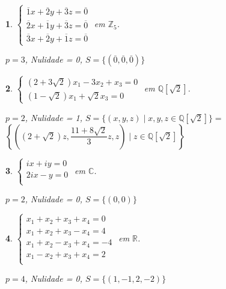 \documentclass[12pt]{exam}
\newtheorem{exercicio}{}
\newcommand{\integer}{\mathbb{Z}}
\newcommand{\rac}{\mathbb{Q}}
\newcommand{\real}{\mathbb{R}}
\newcommand{\complex}{\mathbb{C}}
\begin{document}
\begin{exercicio}
$\begin{cases}
  \overline{1}x + \overline{2}y + \overline{3}z = \overline{0}\\
  \overline{2}x + \overline{1}y + \overline{3}z = \overline{0}\\
  \overline{3}x + \overline{2}y + \overline{1}z = \overline{0}
\end{cases}$ em $\integer_5$.
\begin{solucao}
  $p = 3$, Nulidade = 0, $S = \{(\overline{0},\overline{0},\overline{0})\}$
\end{solucao}
\end{exercicio}

\begin{exercicio}
$\begin{cases}
  (2 + 3\sqrt{2})x_1 - 3x_2 + x_3 = 0\\
  (1 - \sqrt{2})x_1 + \sqrt{2}x_3 = 0
\end{cases}$ em $\rac[\sqrt{2}]$.
\begin{solucao}
  $p = 2$, Nulidade = 1, $S = \{(x, y, z) \mid x, y, z \in \rac[\sqrt{2}]\} = $ \\ $\left\{\left((2 + \sqrt{2})z, \dfrac{11 + 8\sqrt{2}}{3}z, z\right) \mid z \in \rac[\sqrt{2}]\right\}$
\end{solucao}
\end{exercicio}

\begin{exercicio}
$\begin{cases}
  ix + iy = 0\\
  2ix - y = 0\\
\end{cases}$ em $\complex$.
\begin{solucao}
  $p = 2$, Nulidade = 0, $S = \{(0, 0)\}$
\end{solucao}
\end{exercicio}

\begin{exercicio}
$\begin{cases}
  x_1 + x_2 + x_3 + x_4 = 0\\
  x_1 + x_2 + x_3 - x_4 = 4\\
  x_1 + x_2 - x_3 + x_4 = -4\\
  x_1 - x_2 + x_3 + x_4 = 2\\
\end{cases}$ em $\real$.
\begin{solucao}
  $p = 4$, Nulidade = 0, $S = \{(1, -1, 2, -2)\}$
\end{solucao}
\end{exercicio}
\end{document}
